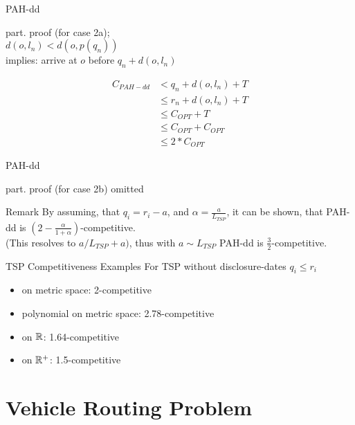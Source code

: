 \documentclass{beamer}
\begin{document}
\begin{frame}{PAH-dd}
  \begin{Proof}
    part. proof (for case 2a);\\
    $d(o,l_n)<d(o,p(q_n))$ \\
    implies: arrive at $o$ before $q_n + d(o,l_n)$
    \begin{small}
    \begin{align}
      C_{PAH-dd} &  < q_n + d(o,l_n) + T \\
		 &\le r_n + d(o,l_n) + T \\
		 &\le C_{OPT} + T \\
		 &\le C_{OPT} + C_{OPT} \\
		 &\le 2* C_{OPT}
    \end{align}
    \end{small}
  \end{Proof}
\end{frame}

\begin{frame}{PAH-dd}
  \begin{Proof}
    part. proof (for case 2b) omitted
  \end{Proof}

  \begin{block}{Remark}
    By assuming, that $q_i = r_i - a$, and $\alpha = \frac{a}{L_{TSP}}$, it can be shown, that PAH-dd is $(2-\frac{\alpha}{1+\alpha})$-competitive.\\
    (This resolves to $a/L_{TSP}+a)$, thus with $a \sim L_{TSP}$ PAH-dd is $\frac{3}{2}$-competitive.
  \end{block}
\end{frame}

\begin{frame}{TSP Competitiveness Examples}
  For TSP without disclosure-dates $q_i \le r_i$
  \begin{itemize}
    \item on metric space: 2-competitive
    \item polynomial on metric space: 2.78-competitive
    \item on $\Bbb{R}$: 1.64-competitive
    \item on $\Bbb{R}^+$: 1.5-competitive
  \end{itemize}
\end{frame}


\section[VRP]{Vehicle Routing Problem}
\end{document}
